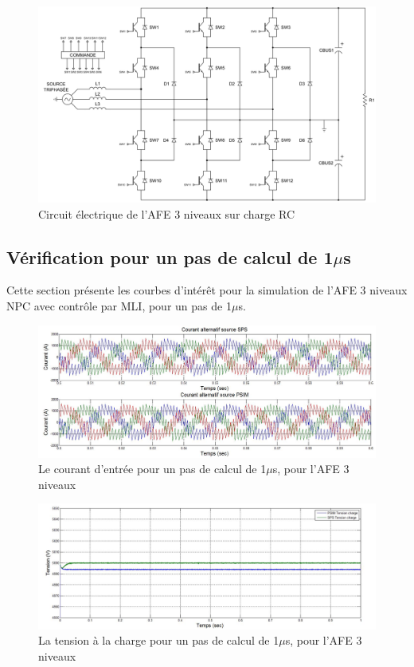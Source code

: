 \begin{figure}[htb]
\centering
\includegraphics[scale=0.6]{fig/AFE_3L_RC.png}
\caption{Circuit électrique de l'AFE 3 niveaux sur charge RC}
\label{circuit_AFE_3L_RC}
\end{figure}


\clearpage
\subsection{Vérification pour un pas de calcul de 1$\mu$s}
Cette section présente les courbes d'intérêt pour la simulation de l'AFE 3 niveaux NPC avec contrôle par MLI, pour un pas de 1$\mu$s. 

\begin{figure}[htb]
\centering
\includegraphics[scale=0.5]{fig/AFE3LEVEL/1u/cour_al.jpg}
\caption{Le courant d'entrée pour un pas de calcul de 1$\mu$s, pour l'AFE 3 niveaux}
\label{AF_3_cou}
\end{figure}


\begin{figure}[htb]
\centering
\includegraphics[scale=0.5]{fig/AFE3LEVEL/1u/vch.jpg}
\caption{La tension à la charge pour un pas de calcul de 1$\mu$s, pour l'AFE 3 niveaux}
\label{AF_3_vch}
\end{figure}


